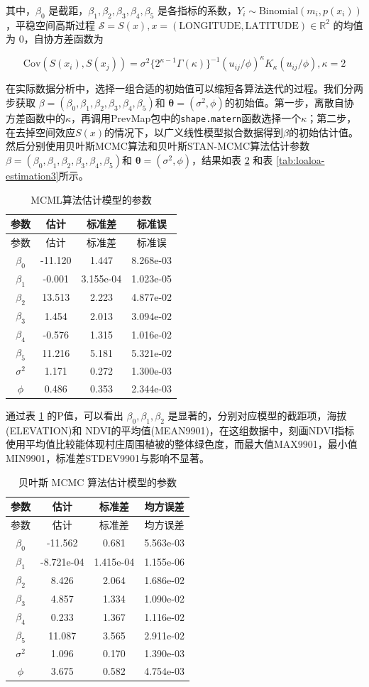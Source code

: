 \documentclass[12pt,a4paper,UTF8,twoside]{book}
\theoremstyle{definition}
\theoremstyle{definition}
\theoremstyle{definition}
\theoremstyle{remark}
\begin{document}
\noindent 其中，\(\beta_0\)
是截距，\(\beta_{1},\beta_{2}, \beta_{3},\beta_{4}, \beta_{5}\)
是各指标的系数，\(Y_{i} \sim \mathrm{Binomial}(m_{i},p(x_i))\)，平稳空间高斯过程
\(\mathcal{S} = S(x), x = ( \mathrm{LONGITUDE}, \mathrm{LATITUDE}) \in \mathbb{R}^2\)
的均值为 0，自协方差函数为

\[
\mathrm{Cov}(S(x_i),S(x_j)) = \sigma^2 \big\{2^{\kappa-1}\Gamma(\kappa)\big\}^{-1}(u_{ij}/\phi)^{\kappa}K_{\kappa}(u_{ij}/\phi), \kappa = 2
\]

在实际数据分析中，选择一组合适的初始值可以缩短各算法迭代的过程。我们分两步获取
\(\beta = (\beta_{0},\beta_{1},\beta_{2}, \beta_{3},\beta_{4}, \beta_{5})\)和
\(\boldsymbol{\theta} = (\sigma^2,\phi)\)的初始值。第一步，离散自协方差函数中的\(\kappa\)，再调用PrevMap包中的\texttt{shape.matern}函数选择一个\(\kappa\)；第二步，在去掉空间效应\(S(x)\)的情况下，以广义线性模型拟合数据得到\(\beta\)的初始估计值。然后分别使用贝叶斯MCMC算法和贝叶斯STAN-MCMC算法估计参数
\(\beta = (\beta_{0},\beta_{1},\beta_{2}, \beta_{3},\beta_{4}, \beta_{5})\)和
\(\boldsymbol{\theta} = (\sigma^2,\phi)\)，结果如表
\ref{tab:loaloa-estimation2} 和表 \ref{tab:loaloa-estimation3}所示。

\begin{longtable}[]{@{}cccc@{}}
\caption{\label{tab:loaloa-estimation1}
MCML算法估计模型的参数}\tabularnewline
\toprule
参数 & 估计 & 标准差 & 标准误\tabularnewline
\midrule
\endfirsthead
\toprule
参数 & 估计 & 标准差 & 标准误\tabularnewline
\midrule
\endhead
\(\beta_{0}\) & -11.120 & 1.447 & 8.268e-03\tabularnewline
\(\beta_{1}\) & -0.001 & 3.155e-04 & 1.023e-05\tabularnewline
\(\beta_{2}\) & 13.513 & 2.223 & 4.877e-02\tabularnewline
\(\beta_{3}\) & 1.454 & 2.013 & 3.094e-02\tabularnewline
\(\beta_{4}\) & -0.576 & 1.315 & 1.016e-02\tabularnewline
\(\beta_{5}\) & 11.216 & 5.181 & 5.321e-02\tabularnewline
\(\sigma^2\) & 1.171 & 0.272 & 1.300e-03\tabularnewline
\(\phi\) & 0.486 & 0.353 & 2.344e-03\tabularnewline
\bottomrule
\end{longtable}

通过表 \ref{tab:loaloa-estimation1} 的P值，可以看出
\(\beta_{0},\beta_{1},\beta_{2}\)
是显著的，分别对应模型的截距项，海拔(ELEVATION)和
NDVI的平均值(MEAN9901)，在这组数据中，刻画NDVI指标使用平均值比较能体现村庄周围植被的整体绿色度，而最大值MAX9901，最小值MIN9901，标准差STDEV9901与影响不显著。

\begin{longtable}[]{@{}cccc@{}}
\caption{\label{tab:loaloa-estimation2} 贝叶斯 MCMC
算法估计模型的参数}\tabularnewline
\toprule
参数 & 估计 & 标准差 & 均方误差\tabularnewline
\midrule
\endfirsthead
\toprule
参数 & 估计 & 标准差 & 均方误差\tabularnewline
\midrule
\endhead
\(\beta_{0}\) & -11.562 & 0.681 & 5.563e-03\tabularnewline
\(\beta_{1}\) & -8.721e-04 & 1.415e-04 & 1.155e-06\tabularnewline
\(\beta_{2}\) & 8.426 & 2.064 & 1.686e-02\tabularnewline
\(\beta_{3}\) & 4.857 & 1.334 & 1.090e-02\tabularnewline
\(\beta_{4}\) & 0.233 & 1.367 & 1.116e-02\tabularnewline
\(\beta_{5}\) & 11.087 & 3.565 & 2.911e-02\tabularnewline
\(\sigma^2\) & 1.096 & 0.170 & 1.390e-03\tabularnewline
\(\phi\) & 3.675 & 0.582 & 4.754e-03\tabularnewline
\bottomrule
\end{longtable}
\end{document}
